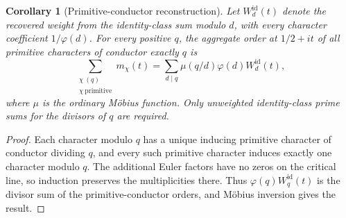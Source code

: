 \documentclass[11pt]{article}
\newtheorem{corollary}[theorem]{Corollary}
\theoremstyle{remark}\newtheorem{remark}[theorem]{Remark}
\begin{document}
\begin{corollary}[Primitive-conductor reconstruction]
Let $W_d^{\mathrm{id}}(t)$ denote the recovered weight from the identity-class sum modulo $d$, with every character coefficient $1/\varphi(d)$. For every positive $q$, the aggregate order at $1/2+it$ of all primitive characters of conductor exactly $q$ is
\[
 \sum_{\substack{\chi\ (q)\\\chi\ \mathrm{primitive}}} m_\chi(t)
 =\sum_{d\mid q}\mu(q/d)\varphi(d)W_d^{\mathrm{id}}(t),
\]
where $\mu$ is the ordinary M\"obius function. Only unweighted identity-class prime sums for the divisors of $q$ are required.
\end{corollary}
\begin{proof}
Each character modulo $q$ has a unique inducing primitive character of conductor dividing $q$, and every such primitive character induces exactly one character modulo $q$. The additional Euler factors have no zeros on the critical line, so induction preserves the multiplicities there. Thus $\varphi(q)W_q^{\mathrm{id}}(t)$ is the divisor sum of the primitive-conductor orders, and M\"obius inversion gives the result.
\end{proof}
\end{document}
